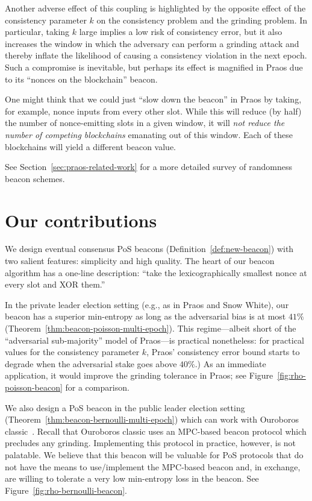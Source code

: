    Another adverse effect of this coupling 
    is highlighted by the opposite effect of the consistency parameter $k$ 
    on the consistency problem and the grinding problem. 
    In particular, taking $k$ large implies a low risk of consistency error, 
    but it also increases the window in which the adversary can perform a grinding attack 
    and thereby inflate the likelihood of causing a consistency violation in the next epoch. 
    Such a compromise is inevitable, 
    but perhaps its effect is magnified in Praos due to its ``nonces on the blockchain'' beacon.

    One might think that we could just ``slow down the beacon'' in Praos 
    by taking, for example, nonce inputs from every other slot. 
    While this will reduce (by half) the number of nonce-emitting slots in a given window, 
    it will \emph{not reduce the number of competing blockchains} emanating out of this window. 
    Each of these blockchains will yield a different beacon value. 


    See Section~\ref{sec:praos-related-work} for 
    a more detailed survey of randomness beacon schemes.



\section{Our contributions}
    We design eventual consensus PoS beacons 
    (Definition~\ref{def:new-beacon}) 
    with two salient features: simplicity and high quality. 
    The heart of our beacon algorithm has a one-line description: 
    ``take the lexicographically smallest nonce at every slot and XOR them.'' 


    In the private leader election setting (e.g., as in Praos and Snow White), 
    our beacon has a superior min-entropy 
    as long as the adversarial bias is at most $41\%$ (Theorem~\ref{thm:beacon-poisson-multi-epoch}). 
    This regime---albeit short of the ``adversarial sub-majority'' model of Praos---is practical nonetheless: 
    for practical values for the consistency parameter $k$, 
    Praos' consistency error bound 
    starts to degrade when the adversarial stake goes above $40\%$.) 
    As an immediate application, it would improve the grinding tolerance in Praos; 
    see Figure~\ref{fig:rho-poisson-beacon} for a comparison.


    We also design a PoS beacon in the public leader election setting (Theorem~\ref{thm:beacon-bernoulli-multi-epoch})
    which can work with Ouroboros classic~\cite{Ouroboros}. 
    Recall that Ouroboros classic uses an MPC-based beacon protocol 
    which precludes any grinding. 
    Implementing this protocol in practice, however, is not palatable. 
    We believe that this beacon will be valuable for 
    PoS protocols 
    that do not have the means to use/implement the MPC-based beacon 
    and, in exchange, are willing to tolerate a very low min-entropy loss 
    in the beacon. 
    See Figure~\ref{fig:rho-bernoulli-beacon}.


